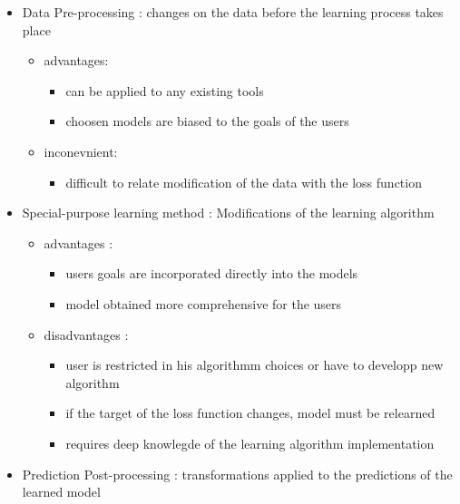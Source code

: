 \documentclass[
]{report}
\providecommand{\tightlist}{%
  \setlength{\itemsep}{0pt}\setlength{\parskip}{0pt}}
\begin{document}
\begin{itemize}
\tightlist
\item
  Data Pre-processing : changes on the data before the learning process takes place

  \begin{itemize}
  \tightlist
  \item
    advantages:

    \begin{itemize}
    \tightlist
    \item
      can be applied to any existing tools
    \item
      choosen models are biased to the goals of the users
    \end{itemize}
  \item
    inconevnient:

    \begin{itemize}
    \tightlist
    \item
      difficult to relate modification of the data with the loss function
    \end{itemize}
  \end{itemize}
\item
  Special-purpose learning method : Modifications of the learning algorithm

  \begin{itemize}
  \tightlist
  \item
    advantages :

    \begin{itemize}
    \tightlist
    \item
      users goals are incorporated directly into the models
    \item
      model obtained more comprehensive for the users
    \end{itemize}
  \item
    disadvantages :

    \begin{itemize}
    \tightlist
    \item
      user is restricted in his algorithmm choices or have to developp new algorithm
    \item
      if the target of the loss function changes, model must be relearned
    \item
      requires deep knowlegde of the learning algorithm implementation
    \end{itemize}
  \end{itemize}
\item
  Prediction Post-processing : transformations applied to the predictions of the learned model


\end{itemize}
\end{document}
